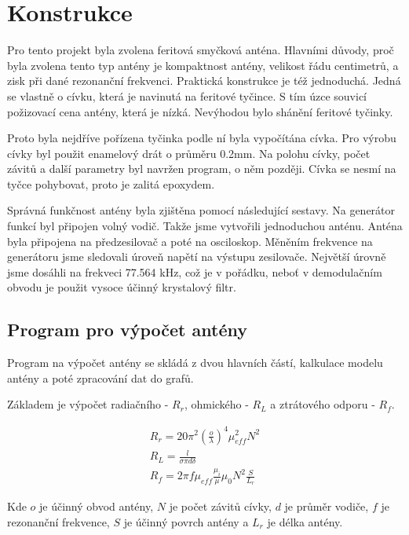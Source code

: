 \newpage

\section{Konstrukce}

Pro tento projekt byla zvolena feritová smyčková anténa. Hlavními důvody, proč byla
zvolena tento typ antény je kompaktnost antény, velikost řádu centimetrů, a zisk při dané
rezonanční frekvenci. Praktická konstrukce je též jednoduchá. Jedná se vlastně o cívku,
která je navinutá na feritové tyčince. S tím úzce souvicí požizovací cena antény, která je
nízká. Nevýhodou bylo shánění feritové tyčinky.

Proto byla nejdříve pořízena tyčinka podle ní byla vypočítána cívka. Pro výrobu cívky byl
použit enamelový drát o průměru 0.2mm. Na polohu cívky, počet závitů a další parametry
byl navržen program, o něm později. Cívka se nesmí na tyčce pohybovat, proto je zalitá
epoxydem.

Správná funkčnost antény byla zjištěna pomocí následující sestavy. Na generátor funkcí byl připojen volný vodič. Takže jsme vytvořili
jednoduchou anténu. Anténa byla připojena na předzesilovač a poté na osciloskop. Měněním
frekvence na generátoru jsme sledovali úroveň napětí na výstupu zesilovače. Největší
úrovně jsme dosáhli na frekveci 77.564 kHz, což je v pořádku, neboť v
demodulačním obvodu je použit vysoce účinný krystalový filtr.

\subsection{Program pro výpočet antény}

Program na výpočet antény se skládá z dvou hlavních částí, kalkulace modelu antény a poté
zpracování dat do grafů.

Základem je výpočet radiačního - $R_r$, ohmického - $R_L$ a ztrátového odporu - $R_f$.

\begin{equation}
    \begin{gathered}
        R_r = 20\pi^2\left(\frac{o}{\lambda}\right)^4 \mu_{eff}^2 N^2 \\
        R_L = \frac{l}{\sigma\pi d \delta} \\
        R_f = 2 \pi f \mu_{eff} \frac{\mu_i}{\mu} \mu_0 N^2 \frac{S}{L_r}
    \end{gathered}
\end{equation}

Kde $o$ je účinný obvod antény, $N$ je počet závitů cívky, $d$ je průměr vodiče, $f$ je
rezonanční frekvence, $S$ je účinný povrch antény a $L_r$ je délka antény.

